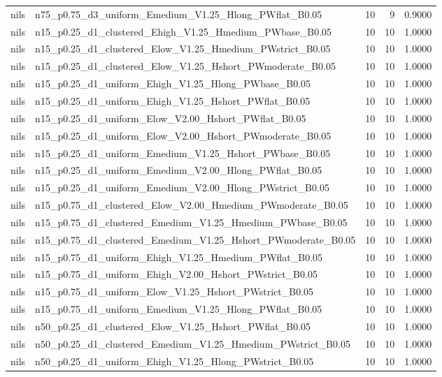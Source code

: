 \begin{tabular}{llrrr}
nils & n75_p0.75_d3_uniform_Emedium_V1.25_Hlong_PWflat_B0.05 & 10 & 9 & 0.9000 \\
nils & n15_p0.25_d1_clustered_Ehigh_V1.25_Hmedium_PWbase_B0.05 & 10 & 10 & 1.0000 \\
nils & n15_p0.25_d1_clustered_Elow_V1.25_Hmedium_PWstrict_B0.05 & 10 & 10 & 1.0000 \\
nils & n15_p0.25_d1_clustered_Elow_V1.25_Hshort_PWmoderate_B0.05 & 10 & 10 & 1.0000 \\
nils & n15_p0.25_d1_uniform_Ehigh_V1.25_Hlong_PWbase_B0.05 & 10 & 10 & 1.0000 \\
nils & n15_p0.25_d1_uniform_Ehigh_V1.25_Hshort_PWflat_B0.05 & 10 & 10 & 1.0000 \\
nils & n15_p0.25_d1_uniform_Elow_V2.00_Hshort_PWflat_B0.05 & 10 & 10 & 1.0000 \\
nils & n15_p0.25_d1_uniform_Elow_V2.00_Hshort_PWmoderate_B0.05 & 10 & 10 & 1.0000 \\
nils & n15_p0.25_d1_uniform_Emedium_V1.25_Hshort_PWbase_B0.05 & 10 & 10 & 1.0000 \\
nils & n15_p0.25_d1_uniform_Emedium_V2.00_Hlong_PWflat_B0.05 & 10 & 10 & 1.0000 \\
nils & n15_p0.25_d1_uniform_Emedium_V2.00_Hlong_PWstrict_B0.05 & 10 & 10 & 1.0000 \\
nils & n15_p0.75_d1_clustered_Elow_V2.00_Hmedium_PWmoderate_B0.05 & 10 & 10 & 1.0000 \\
nils & n15_p0.75_d1_clustered_Emedium_V1.25_Hmedium_PWbase_B0.05 & 10 & 10 & 1.0000 \\
nils & n15_p0.75_d1_clustered_Emedium_V1.25_Hshort_PWmoderate_B0.05 & 10 & 10 & 1.0000 \\
nils & n15_p0.75_d1_uniform_Ehigh_V1.25_Hmedium_PWflat_B0.05 & 10 & 10 & 1.0000 \\
nils & n15_p0.75_d1_uniform_Ehigh_V2.00_Hshort_PWstrict_B0.05 & 10 & 10 & 1.0000 \\
nils & n15_p0.75_d1_uniform_Elow_V1.25_Hshort_PWstrict_B0.05 & 10 & 10 & 1.0000 \\
nils & n15_p0.75_d1_uniform_Emedium_V1.25_Hlong_PWflat_B0.05 & 10 & 10 & 1.0000 \\
nils & n50_p0.25_d1_clustered_Elow_V1.25_Hshort_PWflat_B0.05 & 10 & 10 & 1.0000 \\
nils & n50_p0.25_d1_clustered_Emedium_V1.25_Hmedium_PWstrict_B0.05 & 10 & 10 & 1.0000 \\
nils & n50_p0.25_d1_uniform_Ehigh_V1.25_Hlong_PWstrict_B0.05 & 10 & 10 & 1.0000 \\

\end{tabular}
